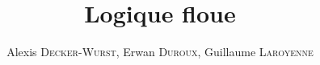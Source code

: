 \documentclass[a4paper,11pt]{article}
\title{Logique floue}
\author{Alexis \textsc{Decker-Wurst}, Erwan  \textsc{Duroux}, Guillaume  \textsc{Laroyenne}}
\begin{document}
\maketitle
\tableofcontents

\begin{abstract}
\end{abstract}

\section{}
\end{document}
